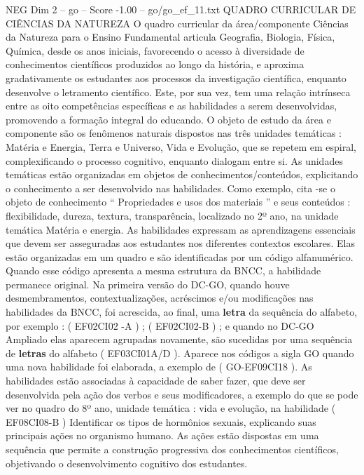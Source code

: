 \begin{textsample}{NEG Dim 2 – go – Score -1.00 – go/go\_ef\_11.txt}  \label{ex:f2_neg_119}
QUADRO CURRICULAR DE CIÊNCIAS DA NATUREZA O quadro curricular da área/componente Ciências da Natureza para o Ensino Fundamental articula Geografia, Biologia, Física, Química, desde os anos iniciais, favorecendo o acesso à diversidade de conhecimentos científicos produzidos ao longo da história, e aproxima gradativamente os estudantes aos processos da investigação científica, enquanto desenvolve o letramento científico.
Este, por sua vez, tem uma relação intrínseca entre as oito competências específicas e as habilidades a serem desenvolvidas, promovendo a formação integral do educando.
O objeto de estudo da área e componente são os fenômenos naturais dispostos nas três unidades temáticas : Matéria e Energia, Terra e Universo, Vida e Evolução, que se repetem em espiral, complexificando o processo cognitivo, enquanto dialogam entre si.
As unidades temáticas estão organizadas em objetos de conhecimentos/conteúdos, explicitando o conhecimento a ser desenvolvido nas habilidades.
Como exemplo, cita -se o objeto de conhecimento “ Propriedades e usos dos materiais ” e seus conteúdos : flexibilidade, dureza, textura, transparência, localizado no 2º ano, na unidade temática Matéria e energia.
As habilidades expressam as aprendizagens essenciais que devem ser asseguradas aos estudantes nos diferentes contextos escolares.
Elas estão organizadas em um quadro e são identificadas por um código alfanumérico.
Quando esse código apresenta a mesma estrutura da BNCC, a habilidade permanece original.
Na primeira versão do DC-GO, quando houve desmembramentos, contextualizações, acréscimos e/ou modificações nas habilidades da BNCC, foi acrescida, ao final, uma \textbf{letra} da sequência do alfabeto, por exemplo : ( EF02CI02 -A ) ; ( EF02CI02-B ) ; e quando no DC-GO Ampliado elas aparecem agrupadas novamente, são sucedidas por uma sequência de \textbf{letras} do alfabeto ( EF03CI01A/D ).
Aparece nos códigos a sigla GO quando uma nova habilidade foi elaborada, a exemplo de ( GO-EF09CI18 ).
As habilidades estão associadas à capacidade de saber fazer, que deve ser desenvolvida pela ação dos verbos e seus modificadores, a exemplo do que se pode ver no quadro do 8º ano, unidade temática : vida e evolução, na habilidade ( EF08CI08-B ) Identificar os tipos de hormônios sexuais, explicando suas principais ações no organismo humano.
As ações estão dispostas em uma sequência que permite a construção progressiva dos conhecimentos científicos, objetivando o desenvolvimento cognitivo dos estudantes.

\end{textsample}
